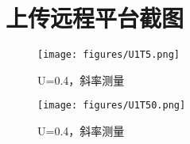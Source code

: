 \documentclass[12pt,hyperref,a4paper,UTF8]{ctexart}
\begin{document}
\section{上传远程平台截图}


\begin{figure}[H]
    \centering
    \begin{minipage}{1\textwidth}
        \centering
        \texttt{[image: figures/U1T5.png]}
        \caption{U=0.4，斜率测量}
        \label{fig:system_block_diagram}
    \end{minipage}
\end{figure}

\begin{figure}[H]
    \centering
    \begin{minipage}{1\textwidth}
        \centering
        \texttt{[image: figures/U1T50.png]}
        \caption{U=0.4，斜率测量}
        \label{fig:system_block_diagram}
    \end{minipage}
\end{figure}
\end{document}
